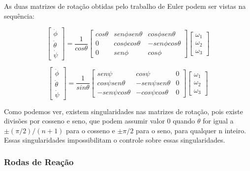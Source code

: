 As duas matrizes de rotação obtidas pelo trabalho de Euler podem ser vistas na sequência: 

\begin{equation}
\begin{bmatrix} \dot { \phi  }  \\ \dot { \theta  }  \\ \dot { \psi  }  \end{bmatrix}=\frac { 1 }{ cos\theta  } \begin{bmatrix} cos\theta  & sen\phi sen\theta  & cos\phi sen\theta  \\ 0 & cos\phi cos\theta  & -sen\phi cos\theta  \\ 0 & sen\phi  & cos\phi  \end{bmatrix}\begin{bmatrix} \omega_1 \\ \omega_2  \\ \omega_3  \end{bmatrix} 
\end{equation}

\begin{equation}
\begin{bmatrix} \dot { \phi  }  \\ \dot { \theta  }  \\ \dot { \psi  }  \end{bmatrix}=\frac { 1 }{ sin\theta  } \begin{bmatrix} sen\psi  & cos\psi  & 0 \\ cos\psi sen\theta  & -sen\psi sen\theta  & 0 \\ -sen\psi cos\theta  & -cos\psi cos\theta  & 0 \end{bmatrix}\begin{bmatrix} \omega _{ 1 } \\ \omega _{ 2 } \\ \omega _{ 3 } \end{bmatrix}
\end{equation}

Como podemos ver, existem singularidades nas matrizes de rotação, pois existe divisões por cosseno e seno, que podem assumir valor 0 quando $\theta$ for igual a $\pm(\pi /2)/(n+1)$ para o cosseno e $\pm\pi /2$ para o seno, para qualquer n inteiro. Essas singularidades impossibilitam o controle sobre essas singularidades.



\subsubsection{Rodas de Reação}

